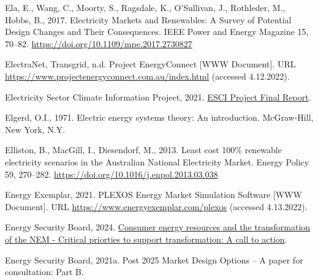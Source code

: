 \documentclass[12pt,a4paper,]{report}
\newlength{\cslhangindent}
\newenvironment{CSLReferences}[2] %
 {%
  \setlength{\parindent}{0pt}
  \ifodd #1 \everypar{\setlength{\hangindent}{\cslhangindent}}\ignorespaces\fi
  \ifnum #2 > 0
  \setlength{\parskip}{#2\baselineskip}
  \fi
 }%
 {}
\begin{document}
\begin{CSLReferences}{1}{0}
\leavevmode{}%
Ela, E., Wang, C., Moorty, S., Ragsdale, K., O'Sullivan, J., Rothleder,
M., Hobbs, B., 2017. Electricity {Markets} and {Renewables}: {A Survey}
of {Potential Design Changes} and {Their Consequences}. IEEE Power and
Energy Magazine 15, 70--82.
\url{https://doi.org/10.1109/mpe.2017.2730827}

\leavevmode{}%
ElectraNet, Transgrid, n.d. Project {EnergyConnect} {[}WWW Document{]}.
URL \url{https://www.projectenergyconnect.com.au/index.html} (accessed
4.12.2022).

\leavevmode{}%
Electricity Sector Climate Information Project, 2021.
\href{https://www.climatechangeinaustralia.gov.au/media/ccia/2.2/cms_page_media/799/ESCI\%20Project\%20final\%20report_210721.pdf}{{ESCI
Project Final Report}}.

\leavevmode{}%
Elgerd, O.I., 1971. Electric energy systems theory: An introduction.
McGraw-Hill, New York, N.Y.

\leavevmode{}%
Elliston, B., MacGill, I., Diesendorf, M., 2013. Least cost 100\%
renewable electricity scenarios in the {Australian National Electricity
Market}. Energy Policy 59, 270--282.
\url{https://doi.org/10.1016/j.enpol.2013.03.038}

\leavevmode{}%
Energy Exemplar, 2021. {PLEXOS} \textbar{} {Energy Market Simulation
Software} {[}WWW Document{]}. URL
\url{https://www.energyexemplar.com/plexos} (accessed 4.13.2022).

\leavevmode{}%
Energy Security Board, 2024.
\href{https://www.energy.gov.au/sites/default/files/2024-02/ESB\%20report\%20-\%20CONSUMER\%20ENERGY\%20RESOURCES\%20AND\%20THE\%20TRANSFORMATION\%20OF\%20THE\%20NEM.pdf}{Consumer
energy resources and the transformation of the {NEM} - {Critical}
priorties to support transformation: A call to action}.

\leavevmode{}%
Energy Security Board, 2021a. Post 2025 {Market Design Options} -- {A}
paper for consultation: {Part B}.


\end{CSLReferences}
\end{document}
